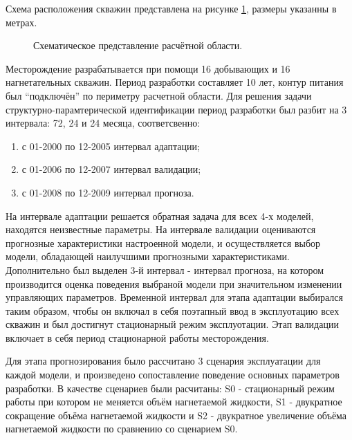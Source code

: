 \documentclass{article}
\begin{document}
Схема расположения скважин представлена на рисунке \ref{fig:map}, размеры указанны в метрах. 
\begin{figure}
    \caption{Схематическое представление расчётной области.}
	\label{fig:map}
\end{figure}

Месторождение разрабатывается при помощи 16 добывающих и 16 нагнетательных скважин. Период разработки составляет 10 лет, контур питания был “подключён” по периметру расчетной области. Для решения задачи структурно-парамтерической идентификации период разработки был разбит на 3 интервала: 72, 24 и 24 месяца, соответсвенно:
\begin{enumerate}
\item с 01-2000 по 12-2005  интервал адаптации;
\item с 01-2006 по 12-2007  интервал валидации;
\item с 01-2008 по 12-2009  интервал прогноза.
\end{enumerate}

На интервале адаптации решается обратная задача для всех 4-х моделей, находятся неизвестные параметры. На интервале валидации оцениваются прогнозные характеристики настроенной модели, и осуществляется выбор модели, обладающей наилучшими прогнозными характеристиками. Дополнительно был выделен 3-й интервал - интервал прогноза, на котором производится оценка поведения выбраной модели при значительном изменении управляющих параметров. Временной интервал для этапа адаптации выбирался таким образом, чтобы он включал в себя поэтапный ввод в эксплуотацию всех скважин и был достигнут стационарный режим эксплуотации. Этап валидации включает в себя период стационарной работы месторождения. 

Для этапа прогнозирования было рассчитано 3 сценария эксплуатации для каждой модели, и произведено сопоставление поведение основных параметров разработки. В качестве сценариев были расчитаны: S0 - стационарный режим работы при котором не меняется объём нагнетаемой жидкости, S1 - двукратное сокращение объёма нагнетаемой жидкости и S2 - двукратное увеличение объёма нагнетаемой жидкости по сравнению со сценарием S0. 
\end{document}
